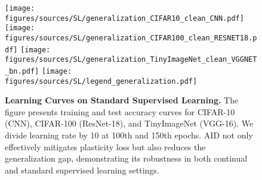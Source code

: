 

\begin{figure*}[h]
    \centering
        \texttt{[image: figures/sources/SL/generalization\_CIFAR10\_clean\_CNN.pdf]}
    \texttt{[image: figures/sources/SL/generalization\_CIFAR100\_clean\_RESNET18.pdf]}
    \texttt{[image: figures/sources/SL/generalization\_TinyImageNet\_clean\_VGGNET\_bn.pdf]}
    \texttt{[image: figures/sources/SL/legend\_generalization.pdf]}
\caption{\textbf{Learning Curves on Standard Supervised Learning.} The figure presents training and test accuracy curves for CIFAR-10 (CNN), CIFAR-100 (ResNet-18), and TinyImageNet (VGG-16). We divide learning rate by 10 at 100th and 150th epochs. AID not only effectively mitigates plasticity loss but also reduces the generalization gap, demonstrating its robustness in both continual and standard supervised learning settings.}
    
    \label{exp_SL}
\end{figure*}



